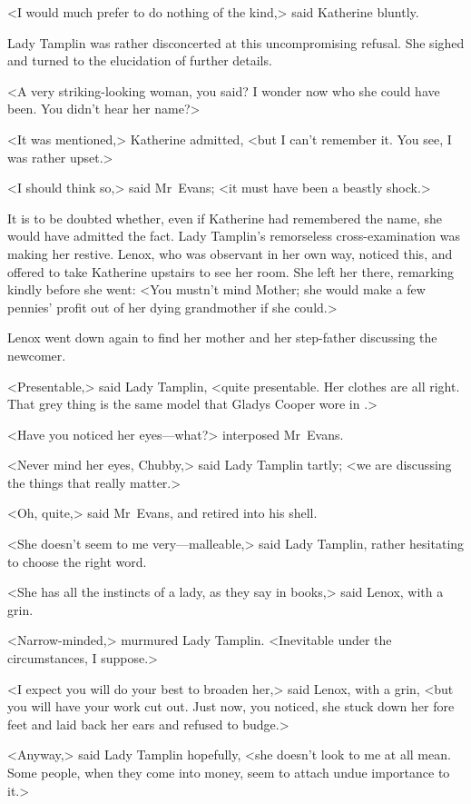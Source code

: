 <I would much prefer to do nothing of the kind,> said Katherine bluntly.

Lady Tamplin was rather disconcerted at this uncompromising refusal. She sighed and turned to the elucidation of further details.

<A very striking-looking woman, you said? I wonder now who she could have been. You didn't hear her name?>

<It was mentioned,> Katherine admitted, <but I can't remember it. You see, I was rather upset.>

<I should think so,> said Mr~Evans; <it must have been a beastly shock.>

It is to be doubted whether, even if Katherine had remembered the name, she would have admitted the fact. Lady Tamplin's remorseless cross-examination was making her restive. Lenox, who was observant in her own way, noticed this, and offered to take Katherine upstairs to see her room. She left her there, remarking kindly before she went: <You mustn't mind Mother; she would make a few pennies' profit out of her dying grandmother if she could.>

Lenox went down again to find her mother and her step-father discussing the newcomer.

<Presentable,> said Lady Tamplin, <quite presentable. Her clothes are all right. That grey thing is the same model that Gladys Cooper wore in .>

<Have you noticed her eyes—what?> interposed Mr~Evans.

<Never mind her eyes, Chubby,> said Lady Tamplin tartly; <we are discussing the things that really matter.>

<Oh, quite,> said Mr~Evans, and retired into his shell.

<She doesn't seem to me very—malleable,> said Lady Tamplin, rather hesitating to choose the right word.

<She has all the instincts of a lady, as they say in books,> said Lenox, with a grin.

<Narrow-minded,> murmured Lady Tamplin. <Inevitable under the circumstances, I suppose.>

<I expect you will do your best to broaden her,> said Lenox, with a grin, <but you will have your work cut out. Just now, you noticed, she stuck down her fore feet and laid back her ears and refused to budge.>

<Anyway,> said Lady Tamplin hopefully, <she doesn't look to me at all mean. Some people, when they come into money, seem to attach undue importance to it.>

